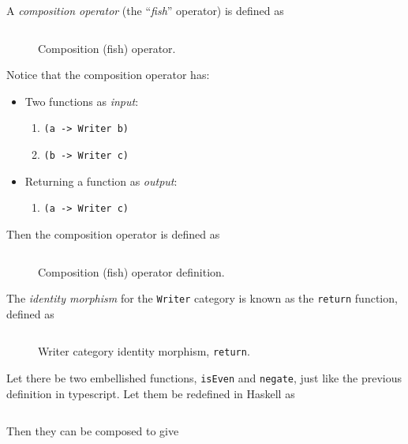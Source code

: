 \begin{definition}
    A \textit{composition operator} (the \enquote{\textit{fish}} operator) is defined as
    \begin{figure}[H]
        \centering
        \inputminted{hs}{content/code-listings/fish.hs}
        \caption{Composition (fish) operator.}
        \label{fig:fish-operator}
    \end{figure}
    
    Notice that the composition operator has:
    \begin{itemize}
        \item Two functions as \textit{input}:
        \begin{enumerate}
            \item \texttt{(a -> Writer b)}
            \item \texttt{(b -> Writer c)}
        \end{enumerate}
        \item Returning a function as \textit{output}:
        \begin{enumerate}
            \item \texttt{(a -> Writer c)}
        \end{enumerate}
    \end{itemize}
    
    Then the composition operator is defined as
    \begin{figure}[H]
        \centering
        \inputminted{hs}{content/code-listings/fish-def.hs}
        \caption{Composition (fish) operator definition.}
        \label{fig:fish-definition}
    \end{figure}
\end{definition}

\begin{definition}
    The \textit{identity morphism} for the \texttt{Writer} category is known as the \texttt{return} function, defined as
    \begin{figure}[H]
        \centering
        \inputminted{hs}{content/code-listings/return.hs}
        \caption{Writer category identity morphism, \texttt{return}.}
        \label{fig:return-writer}
    \end{figure}
\end{definition}

\begin{example}
    Let there be two embellished functions, \texttt{isEven} and \texttt{negate}, just like the previous definition in typescript. Let them be redefined in Haskell as
    \inputminted{hs}{content/code-listings/embellished-functions-iseven-negate.hs}
    
    Then they can be composed to give
    \inputminted{hs}{content/code-listings/embellished-composition-isodd.hs}
\end{example}
